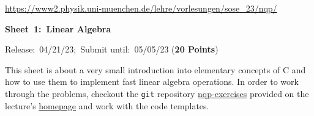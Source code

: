 \documentclass[a4paper, 12pt]{article}
\newcommand\Cpp{C\nolinebreak[4]\hspace{-.05em}\raisebox{.4ex}{\relsize{-3}{\textbf{++}}}}
\begin{document}
	   
\vspace*{-13mm}
\noindent{}
\hfill
%
\hfill\hfill
\hfill
\begin{center}
	\small \url{https://www2.physik.uni-muenchen.de/lehre/vorlesungen/sose_23/nqp/}
\end{center}
%
\vspace{8mm}
%
\centerline{\Large\textbf{Sheet~1:~Linear Algebra}}
%
\vspace{3mm}
%
\normalsize\centerline{Release:~04/21/23;~Submit until:~05/05/23 (\textbf{20 Points})}
%
%
%
\vspace{6mm}
%
This sheet is about a very small introduction into elementary concepts of \Cpp{} and how to use them to implement fast linear algebra operations.
%
In order to work through the problems, checkout the \texttt{git} repository \href{git@gitlab.physik.uni-muenchen.de:nqp/nqp-exercises.git}{nqp-exercises} provided on the lecture's \href{https://www2.physik.uni-muenchen.de/lehre/vorlesungen/sose_23/nqp/uebungen/index.html}{homepage} and work with the code templates.
%
\end{document}
